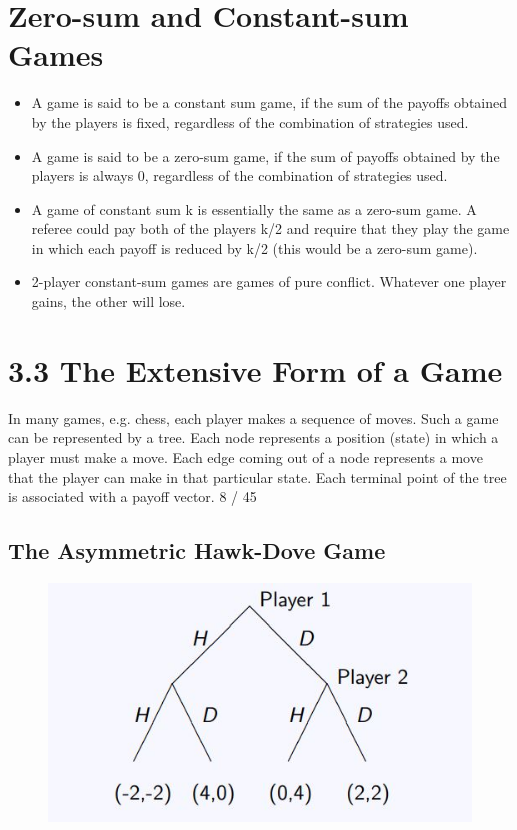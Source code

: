 \documentclass[]{report}
\begin{document}
\section{Zero-sum and Constant-sum Games}
\begin{itemize}
	\item A game is said to be a constant sum game, if the sum of the
	payoffs obtained by the players is fixed, regardless of the
	combination of strategies used.
	\item	A game is said to be a zero-sum game, if the sum of payoffs
	obtained by the players is always 0, regardless of the combination
	of strategies used.
	\item A game of constant sum k is essentially the same as a zero-sum
	game. A referee could pay both of the players k/2 and require that
	they play the game in which each payoff is reduced by k/2 (this
	would be a zero-sum game).
	\item	2-player constant-sum games are games of pure conflict.
	Whatever one player gains, the other will lose.
\end{itemize}

\section{3.3 The Extensive Form of a Game}
In many games, e.g. chess, each player makes a sequence of moves.
Such a game can be represented by a tree. Each node represents a
position (state) in which a player must make a move.
Each edge coming out of a node represents a move that the player
can make in that particular state.
Each terminal point of the tree is associated with a payoff vector.
8 / 45

\subsection{The Asymmetric Hawk-Dove Game}


\begin{figure}[h!]
\centering
\includegraphics[width=0.7\linewidth]{images/DR5-Slide09}
\caption{}
\label{fig:DR5-Slide09}
\end{figure}
\end{document}
